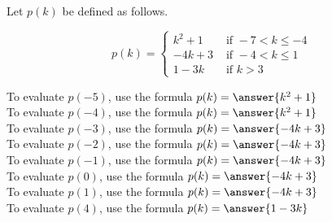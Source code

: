 \documentclass{ximera}
\author{Lee Wayand}
\begin{document}
\begin{exercise}




Let $p(k)$ be defined as follows.

\[
p(k) = 
\begin{cases}
  k^2 + 1 & \text{ if } -7 < k \leq -4 \\
  -4k + 3 & \text{ if } -4 < k \leq 1 \\
  1 - 3k & \text{ if } k > 3
\end{cases}
\]



To evaluate $p(-5)$, use the formula $p(k) = \answer{k^2 + 1}$ \\


To evaluate $p(-4)$, use the formula $p(k) = \answer{k^2 + 1}$ \\


To evaluate $p(-3)$, use the formula $p(k) = \answer{-4k + 3}$ \\


To evaluate $p(-2)$, use the formula $p(k) = \answer{-4k + 3}$ \\


To evaluate $p(-1)$, use the formula $p(k) = \answer{-4k + 3}$ \\


To evaluate $p(0)$, use the formula $p(k) = \answer{-4k + 3}$ \\


To evaluate $p(1)$, use the formula $p(k) = \answer{-4k + 3}$ \\





To evaluate $p(4)$, use the formula $p(k) = \answer{1 - 3k}$ \\


\end{exercise}
\end{document}
